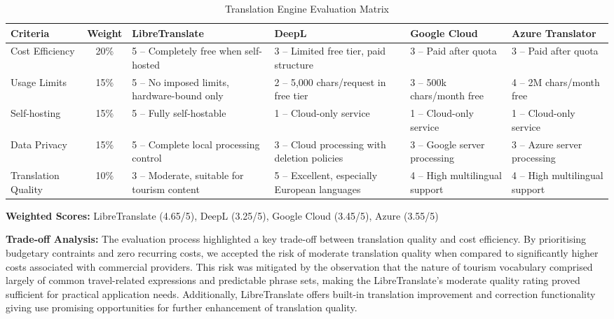 \begin{table}[h!]
\centering
\caption{Translation Engine Evaluation Matrix}
\begin{tabularx}{\textwidth}{l c Y Y Y Y}
\toprule
\textbf{Criteria} & \textbf{Weight} & \textbf{LibreTranslate} & \textbf{DeepL} & \textbf{Google Cloud} & \textbf{Azure Translator} \\
\midrule
Cost Efficiency & 20\% & 5 -- Completely free when self-hosted & 3 -- Limited free tier, paid structure & 3 -- Paid after quota & 3 -- Paid after quota \\
Usage Limits & 15\% & 5 -- No imposed limits, hardware-bound only & 2 -- 5{,}000 chars/request in free tier & 3 -- 500k chars/month free & 4 -- 2M chars/month free \\
Self-hosting & 15\% & 5 -- Fully self-hostable & 1 -- Cloud-only service & 1 -- Cloud-only service & 1 -- Cloud-only service \\
Data Privacy & 15\% & 5 -- Complete local processing control & 3 -- Cloud processing with deletion policies & 3 -- Google server processing & 3 -- Azure server processing \\
Translation Quality & 10\% & 3 -- Moderate, suitable for tourism content & 5 -- Excellent, especially European languages & 4 -- High multilingual support & 4 -- High multilingual support \\
\bottomrule
\end{tabularx}
\label{tab:translation-eval}
\end{table}

\textbf{Weighted Scores:} LibreTranslate (4.65/5), DeepL (3.25/5), Google Cloud (3.45/5), Azure (3.55/5)

\textbf{Trade-off Analysis:}
The evaluation process highlighted a key trade-off between translation quality and cost efficiency. By prioritising budgetary contraints and zero recurring costs, we accepted the risk of moderate translation quality when compared to significantly higher costs associated with commercial providers. This risk was mitigated by the observation that the nature of tourism vocabulary comprised largely of common travel-related expressions and predictable phrase sets, making the LibreTranslate's moderate quality rating proved sufficient for practical application needs\cite{libretranslate}. Additionally, LibreTranslate offers built-in translation improvement and correction functionality giving use promising opportunities for further enhancement of translation quality\cite{open-nmt}.